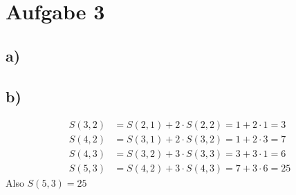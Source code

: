\section*{Aufgabe 3}
\subsection*{a)}
\subsection*{b)}
\begin{align*}
  S(3,2) &= S(2,1)+2\cdot S(2,2) = 1 + 2\cdot 1 = 3\\
  S(4,2) &= S(3,1)+2\cdot S(3,2) = 1 + 2\cdot 3 = 7\\
  S(4,3) &= S(3,2)+3\cdot S(3,3) = 3 + 3\cdot 1 = 6\\
  S(5,3) &= S(4,2)+3\cdot S(4,3) = 7 + 3\cdot6 = 25
\end{align*}
Also $ S(5,3) = 25 $